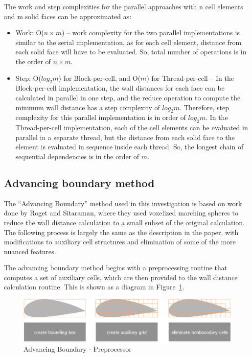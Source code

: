 \documentclass[]{aiaa-tc}%
\begin{document}
The work and step complexities for the parallel approaches with n cell
elements and m solid faces can be approximated as:

\begin{itemize}

\item Work: O($n \times m$) – work complexity for the two parallel
  implementations is similar to the serial implementation, as for each
  cell element, distance from each solid face will have to be
  evaluated.  So, total number of operations is in the order of $n
  \times m$.

\item Step: O($log_2 m$) for Block-per-cell, and O($m$) for
  Thread-per-cell – In the Block-per-cell implementation, the wall
  distances for each face can be calculated in parallel in one step,
  and the reduce operation to compute the minimum wall distance has a
  step complexity of $log_2 m$.  Therefore, step complexity for this
  parallel implementation is in order of $log_2 m$.  In the
  Thread-per-cell implementation, each of the cell elements can be
  evaluated in parallel in a separate thread, but the distance from
  each solid face to the element is evaluated in sequence inside each
  thread.  So, the longest chain of sequential dependencies is in the
  order of $m$.

\end{itemize}



\subsection{Advancing boundary method}
The ``Advancing Boundary'' method used in this investigation is based
on work done by Roget and Sitaraman, where they used
voxelized marching spheres to reduce the wall distance calculation to a small
subset of the original calculation.\cite{roget:12} The following process is largely the
same as the description in the paper, with modifications to auxiliary
cell structures and elimination of some of the more nuanced features.

The advancing boundary method begins with a preprocessing routine that
computes a set of auxiliary cells, which are then provided to the wall
distance calculation routine. This is shown
as a diagram in Figure~\ref{f:ab_preprocessor}.

\begin{figure}
  \centering
  \includegraphics[width=0.6\linewidth]{figures/preprocessor/preprocessor_diagram}
  \caption{Advancing Boundary - Preprocessor}
  \label{f:ab_preprocessor}
\end{figure}
\end{document}
